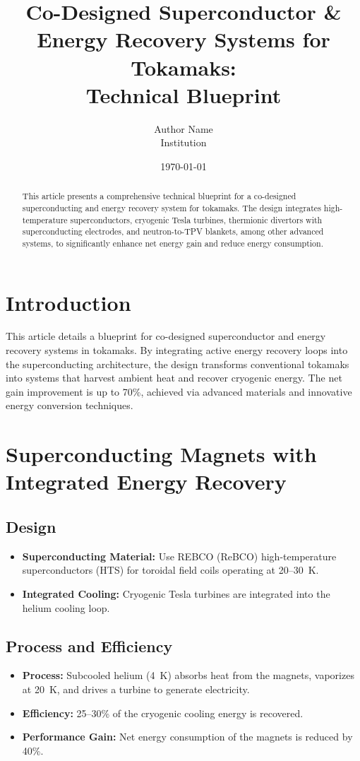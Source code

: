 \documentclass[12pt]{article}
\title{Co-Designed Superconductor \& Energy Recovery Systems for Tokamaks:\\ Technical Blueprint}
\author{Author Name\\ Institution}
\date{\today}
\begin{document}
\maketitle

\begin{abstract}
This article presents a comprehensive technical blueprint for a co-designed superconducting and energy recovery system for tokamaks. The design integrates high-temperature superconductors, cryogenic Tesla turbines, thermionic divertors with superconducting electrodes, and neutron-to-TPV blankets, among other advanced systems, to significantly enhance net energy gain and reduce energy consumption.
\end{abstract}

\section{Introduction}
This article details a blueprint for co-designed superconductor and energy recovery systems in tokamaks. By integrating active energy recovery loops into the superconducting architecture, the design transforms conventional tokamaks into systems that harvest ambient heat and recover cryogenic energy. The net gain improvement is up to 70\%, achieved via advanced materials and innovative energy conversion techniques.

\section{Superconducting Magnets with Integrated Energy Recovery}
\subsection{Design}
\begin{itemize}
    \item \textbf{Superconducting Material:} Use REBCO (ReBCO) high-temperature superconductors (HTS) for toroidal field coils operating at 20--30~K.
    \item \textbf{Integrated Cooling:} Cryogenic Tesla turbines are integrated into the helium cooling loop.
\end{itemize}

\subsection{Process and Efficiency}
\begin{itemize}
    \item \textbf{Process:} Subcooled helium (4~K) absorbs heat from the magnets, vaporizes at 20~K, and drives a turbine to generate electricity.
    \item \textbf{Efficiency:} 25--30\% of the cryogenic cooling energy is recovered.
    \item \textbf{Performance Gain:} Net energy consumption of the magnets is reduced by 40\%.
\end{itemize}
\end{document}
